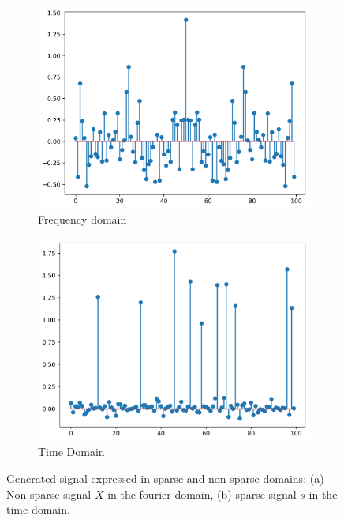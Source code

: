 \documentclass[11pt]{article}
\begin{document}
\begin{figure} [H]
    \centering
    \begin{subfigure}{.45\textwidth}
        \centering
        \includegraphics[width=\linewidth]{figs/q2b_original_sparse_signal_fft.png}
        \caption{Frequency domain}
        \label{fig:sparse_signal_fourier}
    \end{subfigure}%
    \begin{subfigure}{.45\textwidth}
        \centering
        \includegraphics[width=\linewidth]{figs/q2b_original_sparse_signal.png}
        \caption{Time Domain}
        \label{fig:sparse_signal}
    \end{subfigure}%

    \caption{Generated signal expressed in sparse and non sparse domains: (a) Non sparse signal \( X\) in the fourier domain, (b) sparse signal \( s \) in the time domain.}
    \label{fig:compressed_sensing_signal}
\end{figure}
\end{document}
